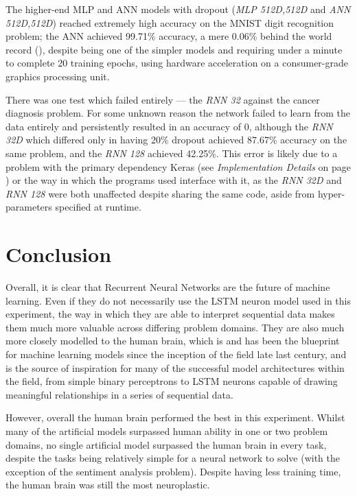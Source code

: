 \documentclass[]{report}
\begin{document}
The higher-end MLP and ANN models with dropout (\emph{MLP 512D,512D} and \emph{ANN 512D,512D}) reached extremely high accuracy on the MNIST digit recognition problem; the ANN achieved 99.71\% accuracy, a mere 0.06\% behind the world record (\cite{ciregan2012multi}), despite being one of the simpler models and requiring under a minute to complete 20 training epochs, using hardware acceleration on a consumer-grade graphics processing unit.

There was one test which failed entirely --- the \emph{RNN 32} against the cancer diagnosis problem. For some unknown reason the network failed to learn from the data entirely and persistently resulted in an accuracy of 0, although the \emph{RNN 32D} which differed only in having 20\% dropout achieved 87.67\% accuracy on the same problem, and the \emph{RNN 128} achieved 42.25\%. This error is likely due to a problem with the primary dependency Keras (see \emph{Implementation Details} on page \pageref{sec:Appendix_I}) or the way in which the programs used interface with it, as the \emph{RNN 32D} and \emph{RNN 128} were both unaffected despite sharing the same code, aside from hyper-parameters specified at runtime.

\section{Conclusion}

Overall, it is clear that Recurrent Neural Networks are the future of machine learning. Even if they do not necessarily use the LSTM neuron model used in this experiment, the way in which they are able to interpret sequential data makes them much more valuable across differing problem domains. They are also much more closely modelled to the human brain, which is and has been the blueprint for machine learning models since the inception of the field late last century, and is the source of inspiration for many of the successful model architectures within the field, from simple binary perceptrons to LSTM neurons capable of drawing meaningful relationships in a series of sequential data.

However, overall the human brain performed the best in this experiment. Whilst many of the artificial models surpassed human ability in one or two problem domains, no single artificial model surpassed the human brain in every task, despite the tasks being relatively simple for a neural network to solve (with the exception of the sentiment analysis problem). Despite having less training time, the human brain was still the most neuroplastic.
\end{document}
